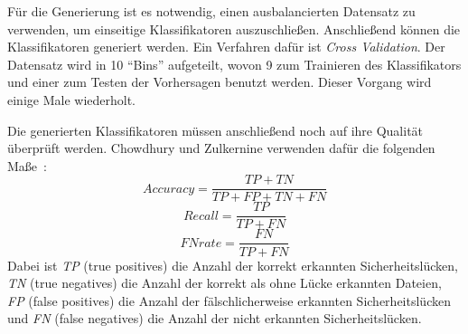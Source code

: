 Für die Generierung ist es notwendig, einen ausbalancierten Datensatz zu verwenden, um einseitige Klassifikatoren auszuschließen.
Anschließend können die Klassifikatoren generiert werden.
Ein Verfahren dafür ist \emph{Cross Validation}\cite{chowdhury_zulkernine_2009}.
Der Datensatz wird in 10 "`Bins"' aufgeteilt, wovon 9 zum Trainieren des Klassifikators und einer zum Testen der Vorhersagen benutzt werden.
Dieser Vorgang wird einige Male wiederholt.

Die generierten Klassifikatoren müssen anschließend noch auf ihre Qualität überprüft werden.
Chowdhury und Zulkernine verwenden dafür die folgenden Maße~\cite{chowdhury_zulkernine_2009}:
\begin{equation}
	Accuracy = \frac{TP+TN}{TP+FP+TN+FN}
\end{equation}
\begin{equation}
	Recall = \frac{TP}{TP+FN}
\end{equation}
\begin{equation}
	FN rate = \frac{FN}{TP+FN}
\end{equation}
Dabei ist \emph{TP} (true positives) die Anzahl der korrekt erkannten Sicherheitslücken,
\emph{TN} (true negatives) die Anzahl der korrekt als ohne Lücke erkannten Dateien,
\emph{FP} (false positives) die Anzahl der fälschlicherweise erkannten Sicherheitslücken und
\emph{FN} (false negatives) die Anzahl der nicht erkannten Sicherheitslücken.
